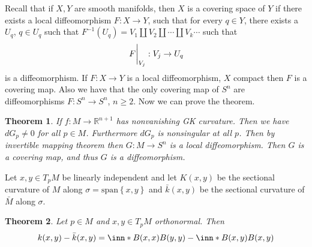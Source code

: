 \documentclass[a4paper]{article}
\newtheorem*{thm}{Theorem}
\begin{document}
Recall that if $X,Y$ are smooth manifolds, then $X$ is a covering space of $Y$ if there exists a local diffeomorphism $F: X \rightarrow Y$, such that for every $q \in Y$, there exists a $U_q$, $q \in U_q$ such that $F^{-1}(U_q) = V_1 \coprod V_2 \coprod \cdots \coprod V_k \cdots$ such that 
\[
  \eval{F}_{V_j}: V_j \rightarrow U_q
\]
is a diffeomorphism. If $F: X \rightarrow Y$ is a local diffeomorphism, $X$ compact then $F$ is a covering map. Also we have that the only covering map of $S^n$ are diffeomorphisms $F: S^n \rightarrow S^n$, $n \geq 2$. Now we can prove the theorem.

\begin{thm}
  If $f:M \rightarrow \mathds{R}^{n+1}$ has nonvanishing GK curvature. Then we have $dG_p \neq 0$ for all $p \in M$. Furthermore $dG_p$ is nonsingular at all $p$. Then by invertible mapping theorem then $G:M \rightarrow S^n$ is a local diffeomorphism. Then $G$ is a covering map, and thus $G$ is a diffeomorphism.
\end{thm}
Let $x,y \in T_pM$ be linearly independent and let $K(x,y)$ be the sectional curvature of $M$ along $\sigma = \text{span} \left\{ x,y \right\}$ and $\bar{k}(x,y)$ be the sectional curvature of $\bar{M}$ along $\sigma$.

\begin{thm}
  Let $p \in M$ and $x,y \in T_pM$ orthonormal. Then 
  \[
    k(x,y) - \bar{k}(x,y) = \inn*{B(x,x)}{B(y,y)} - \inn*{B(x,y)}{B(x,y)}
  \]
\end{thm}
\end{document}
